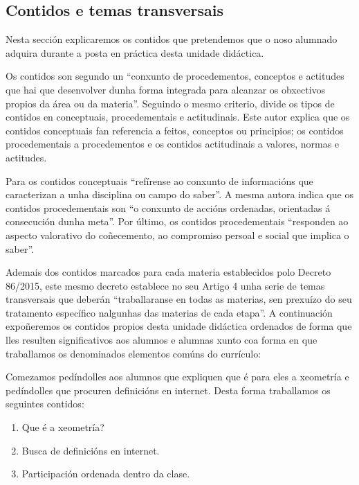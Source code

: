 \subsection{Contidos e temas transversais}\label{sec:contidos}

Nesta sección explicaremos os contidos que pretendemos que o noso alumnado adquira durante a posta en práctica desta unidade didáctica.

Os contidos son segundo  un ``conxunto de procedementos, conceptos e actitudes que hai que desenvolver dunha forma integrada para alcanzar os obxectivos propios da área ou da materia''. Seguindo o mesmo criterio,  divide os tipos de contidos en conceptuais, procedementais e actitudinais. Este autor explica que os contidos conceptuais fan referencia a feitos, conceptos ou principios; os contidos procedementais a procedementos e os contidos actitudinais a valores, normas e actitudes.

Para  os contidos conceptuais ``refírense ao conxunto de informacións que caracterizan a unha disciplina ou campo do saber''. A mesma autora indica que os contidos procedementais son ``o conxunto de accións ordenadas, orientadas á consecución dunha meta''. Por último, os contidos procedementais ``responden ao aspecto valorativo do coñecemento, ao compromiso persoal e social que implica o saber''.

Ademais dos contidos marcados para cada materia establecidos polo Decreto 86/2015, este mesmo decreto establece no seu Artigo 4 unha serie de temas transversais que deberán ``traballaranse en todas as materias, sen prexuízo do seu tratamento específico nalgunhas das materias de cada etapa''. A continuación expoñeremos os contidos propios desta unidade didáctica ordenados de forma que lles resulten significativos aos alumnos e alumnas xunto coa forma en que traballamos os denominados elementos comúns do currículo:

Comezamos pedíndolles aos alumnos que expliquen que é para eles a xeometría e pedíndolles que procuren definicións en internet. Desta forma traballamos os seguintes contidos:

\begin{enumerate}[label=\bfseries Con\arabic*, align=left, leftmargin=1.5cm]
    \item\label{con:xeometria} Que é a xeometría?
    \item\label{con:buscadefinicions} Busca de definicións en internet.
    \item\label{con:participacionclase} Participación ordenada dentro da clase.
\end{enumerate}

